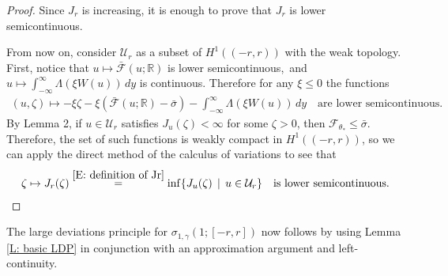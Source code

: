 \documentclass[12pt]{amsart}
\begin{document}
	
		\begin{proof} Since $J_{r}$ is increasing, it is enough to prove that $ J_{ r } $ is lower semicontinuous.
		
		From now on, consider $\mathcal{U}_{r}$ as a subset of $H^{1}((-r,r))$ with the weak topology.  First, notice that $ u \mapsto \bar{\mathscr{F}} ( u ; \mathbb{R} ) $ is lower semicontinuous,~and $ u \mapsto \int_{ -\infty }^{ \infty} \Lambda ( \xi W ( u ) ) \, dy $ is continuous. Therefore for any $ \xi \leq 0 $ the functions
		\begin{align*}
			( u , \zeta ) \mapsto - \xi \zeta - \xi (\bar{\mathscr{F}} ( u ; \mathbb{R} ) - \bar \sigma ) -  \int_{ -\infty }^{ \infty} \Lambda ( \xi W ( u ) ) \, dy
			\quad \text{are~lower semicontinuous}.
		\end{align*}
		By Lemma 2, if $u \in \mathcal{U}_{r}$ satisfies $J_{u}(\zeta) < \infty$ for some $\zeta > 0$, then $\mathscr{F}_{\theta_{*}} \leq \bar{\sigma}$.  Therefore, the set of such functions is weakly compact in $H^{1}((-r,r))$, so we can apply the direct method of the calculus of variations to see that
		\begin{align*}
			\zeta \mapsto J_{r} ( \zeta ) \stackrel{ \eqref{E: definition of Jr} }{ = } \inf \{ J_{ u } ( \zeta ) \, \mid \, u \in \mathcal{U}_{r} \}
			\quad \text{is lower semicontinuous}.
		\end{align*}
    \end{proof}
   
The large deviations principle for $\sigma_{1,\gamma}(1;[-r,r])$ now follows by using Lemma \ref{L: basic LDP} in conjunction with an approximation argument and left-continuity.
 
\end{document}
